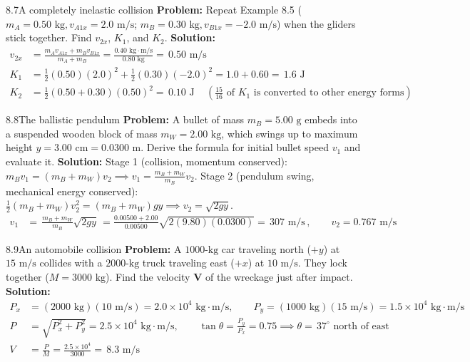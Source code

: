 \documentclass[11pt,a4paper,openany,oneside]{book}
\newcommand{\eqbox}[1]{\boxed{\,#1\,}}
\newcommand{\vect}[1]{\mathbf{#1}}
\numberwithin{equation}{chapter}
\newcommand{\bk}[1]{\texorpdfstring{\enspace{\normalfont\small\color{slate}[Book #1]}}{ [Book #1]}}
\begin{document}
\begin{example}{8.7}{A completely inelastic collision\bk{p.\ 252}}
\textbf{Problem:} Repeat Example 8.5 ($m_A = 0.50\text{ kg}, v_{A1x} = 2.0\text{ m/s}$; $m_B = 0.30\text{ kg}, v_{B1x} = -2.0\text{ m/s}$) when the gliders stick together. Find $v_{2x}$, $K_1$, and $K_2$.
\tcblower
\textbf{Solution:}
\begin{align*}
  v_{2x} &= \frac{m_A v_{A1x} + m_B v_{B1x}}{m_A + m_B} = \frac{0.40\text{ kg}\cdot\text{m/s}}{0.80\text{ kg}} = \eqbox{0.50\text{ m/s}}\\
  K_1 &= \frac{1}{2}(0.50)(2.0)^2 + \frac{1}{2}(0.30)(-2.0)^2 = 1.0 + 0.60 = \eqbox{1.6\text{ J}}\\
  K_2 &= \frac{1}{2}(0.50 + 0.30)(0.50)^2 = \eqbox{0.10\text{ J}} \quad\left(\frac{15}{16}\text{ of }K_1\text{ is converted to other energy forms}\right)
\end{align*}
\end{example}

\begin{example}{8.8}{The ballistic pendulum\bk{p.\ 253}}
\textbf{Problem:} A bullet of mass $m_B = 5.00\text{ g}$ embeds into a suspended wooden block of mass $m_W = 2.00\text{ kg}$, which swings up to maximum height $y = 3.00\text{ cm} = 0.0300\text{ m}$. Derive the formula for initial bullet speed $v_1$ and evaluate it.
\tcblower
\textbf{Solution:} Stage 1 (collision, momentum conserved): $m_B v_1 = (m_B + m_W)v_2 \implies v_1 = \frac{m_B + m_W}{m_B}v_2$.
Stage 2 (pendulum swing, mechanical energy conserved): $\frac{1}{2}(m_B + m_W)v_2^2 = (m_B + m_W)gy \implies v_2 = \sqrt{2gy}$.
\begin{align*}
  v_1 &= \eqbox{\frac{m_B + m_W}{m_B}\sqrt{2gy}} = \frac{0.00500 + 2.00}{0.00500}\sqrt{2(9.80)(0.0300)} = \eqbox{307\text{ m/s}}, \qquad v_2 = 0.767\text{ m/s}
\end{align*}
\end{example}

\begin{example}{8.9}{An automobile collision\bk{p.\ 254}}
\textbf{Problem:} A $1000\text{-kg}$ car traveling north ($+y$) at $15\text{ m/s}$ collides with a $2000\text{-kg}$ truck traveling east ($+x$) at $10\text{ m/s}$. They lock together ($M = 3000\text{ kg}$). Find the velocity $\vect{V}$ of the wreckage just after impact.
\tcblower
\textbf{Solution:}
\begin{align*}
  P_x &= (2000\text{ kg})(10\text{ m/s}) = 2.0\times 10^4\text{ kg}\cdot\text{m/s}, \qquad P_y = (1000\text{ kg})(15\text{ m/s}) = 1.5\times 10^4\text{ kg}\cdot\text{m/s}\\
  P &= \sqrt{P_x^2 + P_y^2} = 2.5\times 10^4\text{ kg}\cdot\text{m/s}, \qquad \tan\theta = \frac{P_y}{P_x} = 0.75 \implies \theta = \eqbox{37^\circ\text{ north of east}}\\
  V &= \frac{P}{M} = \frac{2.5\times 10^4}{3000} = \eqbox{8.3\text{ m/s}}
\end{align*}
\end{example}
\end{document}
